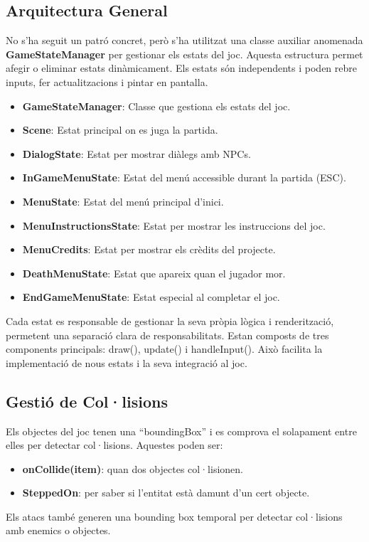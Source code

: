 \documentclass[a4paper,12pt]{article}
\begin{document}
\subsection{Arquitectura General}
No s'ha seguit un patró concret, però s'ha utilitzat una classe auxiliar anomenada \textbf{GameStateManager} per gestionar els estats del joc. Aquesta estructura permet afegir o eliminar estats dinàmicament. Els estats són independents i poden rebre inputs, fer actualitzacions i pintar en pantalla.

\begin{itemize}
    \item \textbf{GameStateManager}: Classe que gestiona els estats del joc.
    \item \textbf{Scene}: Estat principal on es juga la partida.
    \item \textbf{DialogState}: Estat per mostrar diàlegs amb NPCs.
    \item \textbf{InGameMenuState}: Estat del menú accessible durant la partida (ESC).
    \item \textbf{MenuState}: Estat del menú principal d'inici.
    \item \textbf{MenuInstructionsState}: Estat per mostrar les instruccions del joc.
    \item \textbf{MenuCredits}: Estat per mostrar els crèdits del projecte.
    \item \textbf{DeathMenuState}: Estat que apareix quan el jugador mor.
    \item \textbf{EndGameMenuState}: Estat especial al completar el joc.
\end{itemize}

Cada estat es responsable de gestionar la seva pròpia lògica i renderització, permetent una separació clara de responsabilitats. Estan composts de tres components principals: draw(), update() i handleInput(). Això facilita la implementació de nous estats i la seva integració al joc.

\subsection{Gestió de Col·lisions}
Els objectes del joc tenen una ``boundingBox'' i es comprova el solapament entre elles per detectar col·lisions. Aquestes poden ser:
\begin{itemize}
    \item \textbf{onCollide(item)}: quan dos objectes col·lisionen.
    \item \textbf{SteppedOn}: per saber si l'entitat està damunt d'un cert objecte.
\end{itemize}
Els atacs també generen una bounding box temporal per detectar col·lisions amb enemics o objectes.
\end{document}
